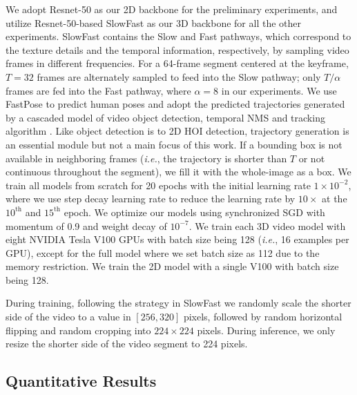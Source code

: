 \documentclass[sigconf]{acmart}
\begin{document}
We adopt Resnet-50 \cite{he2016deep} as our 2D backbone for the preliminary experiments, and utilize Resnet-50-based SlowFast \cite{feichtenhofer2019slowfast} as our 3D backbone for all the other experiments.
SlowFast contains the Slow and Fast pathways, which correspond to the texture details and the temporal information, respectively, by sampling video frames in different frequencies.
For a 64-frame segment centered at the keyframe, $T=32$ frames are alternately sampled to feed into the Slow pathway; only $T/\alpha$ frames are fed into the Fast pathway, where $\alpha = 8$ in our experiments. 
We use FastPose \cite{fang2017rmpe} to predict human poses and adopt the predicted trajectories generated by a cascaded model of video object detection, temporal NMS and tracking algorithm \cite{sun2019video}. 
Like object detection is to 2D HOI detection, trajectory generation is an essential module but not a main focus of this work.
If a bounding box is not available in neighboring frames (\emph{i.e.}, the trajectory is shorter than $T$ or not continuous throughout the segment), we fill it with the whole-image as a box.
We train all models from scratch for 20 epochs with the initial learning rate $1 \times 10^{-2}$, where we use step decay learning rate to reduce the learning rate by $10\times$ at the $10^{\text{th}}$ and $15^{\text{th}}$ epoch.
We optimize our models using synchronized SGD with momentum of 0.9 and weight decay of $10^{-7}$.
We train each 3D video model with eight NVIDIA Tesla V100 GPUs with batch size being 128 (\emph{i.e.}, 16 examples per GPU), except for the full model where we set batch size as 112 due to the memory restriction.
We train the 2D model with a single V100 with batch size being 128.

During training, following the strategy in SlowFast we randomly scale the shorter side of the video to a value in $[256, 320]$ pixels, followed by random horizontal flipping and random cropping into $224 \times 224$ pixels. 
During inference, we only resize the shorter side of the video segment to 224 pixels.



\subsection{Quantitative Results}
\label{subsec:quantitative}
\end{document}
